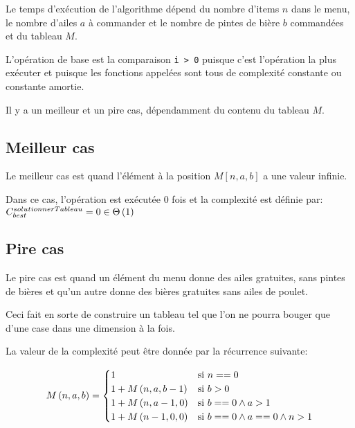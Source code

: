 \documentclass[class=article]{standalone}
\begin{document}
Le temps d'exécution de l'algorithme dépend du nombre d'items $n$ dans le menu,
le nombre d'ailes $a$ à commander et le nombre de pintes de bière $b$ commandées
et du tableau $M$.

L'opération de base est la comparaison \lstinline{i > 0} puisque c'est l'opération
la plus exécuter et puisque les fonctions appelées sont tous de complexité constante
ou constante amortie. 

Il y a un meilleur et un pire cas, dépendamment du contenu du tableau $M$.

\subsection*{Meilleur cas}

Le meilleur cas est quand l'élément à la position $M[n,a,b]$ a une valeur infinie.

Dans ce cas, l'opération est exécutée 0 fois et la complexité est définie par:
$C^{solutionnerTableau}_{best} = 0 \in \Theta\left ( 1 \right )$

\subsection*{Pire cas}

Le pire cas est quand un élément du menu donne des ailes gratuites, sans pintes de bières
et qu'un autre donne des bières gratuites sans ailes de poulet.

Ceci fait en sorte de construire un tableau tel que l'on ne pourra bouger que d'une case
dans une dimension à la fois.

La valeur de la complexité peut être donnée par la récurrence suivante:

\[
    M\left ( n, a, b \right ) =
    \begin{cases}
        1 & \text{si } n == 0 \\
        1 + M\left ( n, a, b-1 \right ) & \text{si } b > 0 \\
        1 + M\left ( n, a-1, 0 \right ) & \text{si } b == 0 \wedge a > 1 \\
        1 + M\left ( n-1, 0, 0 \right ) & \text{si } b == 0 \wedge a == 0 \wedge n > 1 \\
    \end{cases}
\]
\end{document}
